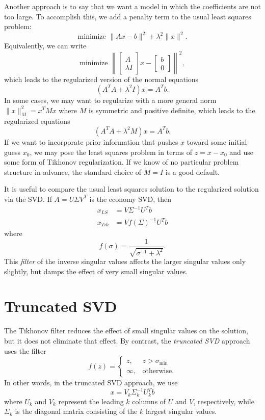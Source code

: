 \documentclass[12pt, leqno]{article} %
\begin{document}
Another approach is to say that we want a model in which the
coefficients are not too large.  To accomplish this, we add
a penalty term to the usual least squares problem:
\[
  \mbox{minimize } \|Ax-b\|^2 + \lambda^2 \|x\|^2.
\]
Equivalently, we can write
\[
\mbox{minimize } \left\|
\begin{bmatrix} A \\ \lambda I \end{bmatrix} x -
\begin{bmatrix} b \\ 0 \end{bmatrix}
\right\|^2,
\]
which leads to the regularized version of the normal equations
\[
  (A^T A + \lambda^2 I) x = A^T b.
\]
In some cases, we may want to regularize with a more general
norm $\|x\|_M^2 = x^T M x$ where $M$ is symmetric and positive
definite, which leads to the regularized equations
\[
  (A^T A + \lambda^2 M) x = A^T b.
\]
If we want to incorporate prior information that pushes $x$
toward some initial guess $x_0$, we may pose the least squares
problem in terms of $z = x-x_0$ and use some form of Tikhonov
regularization.  If we know of no particular problem structure
in advance, the standard choice of $M = I$ is a good default.

It is useful to compare the usual least squares solution to the
regularized solution via the SVD.  If $A = U \Sigma V^T$ is the
economy SVD, then
\begin{align*}
  x_{LS} &= V \Sigma^{-1} U^T b \\
  x_{Tik} &= V f(\Sigma)^{-1} U^T b
\end{align*}
where
\[
  f(\sigma) = \frac{1}{\sqrt{\sigma^{-1} + \lambda^2}}.
\]
This {\em filter} of the inverse singular values affects the larger
singular values only slightly, but damps the effect of very small
singular values.

\section{Truncated SVD}

The Tikhonov filter reduces the effect of small singular values on
the solution, but it does not eliminate that effect.  By contrast,
the {\em truncated SVD} approach uses the filter
\[
f(z) =
\begin{cases}
  z, & z > \sigma_{\min} \\
  \infty, & \mbox{otherwise}.
\end{cases}
\]
In other words, in the truncated SVD approach, we use
\[
  x = V_k \Sigma_k^{-1} U_k^T b
\]
where $U_k$ and $V_k$ represent the leading $k$ columns of $U$ and
$V$, respectively, while $\Sigma_k$ is the diagonal matrix consisting
of the $k$ largest singular values.
\end{document}
